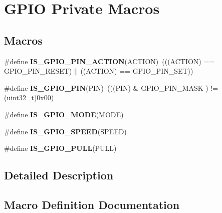 \hypertarget{group___g_p_i_o___private___macros}{}\section{G\+P\+IO Private Macros}
\label{group___g_p_i_o___private___macros}
\subsection*{Macros}
\begin{DoxyCompactItemize}
\item 
\#define {\bfseries I\+S\+\_\+\+G\+P\+I\+O\+\_\+\+P\+I\+N\+\_\+\+A\+C\+T\+I\+ON}(A\+C\+T\+I\+ON)~(((A\+C\+T\+I\+ON) == G\+P\+I\+O\+\_\+\+P\+I\+N\+\_\+\+R\+E\+S\+ET) $\vert$$\vert$ ((A\+C\+T\+I\+ON) == G\+P\+I\+O\+\_\+\+P\+I\+N\+\_\+\+S\+ET))\hypertarget{group___g_p_i_o___private___macros_ga6da646a4924c5cfae3024c660476f26f}{}\label{group___g_p_i_o___private___macros_ga6da646a4924c5cfae3024c660476f26f}

\item 
\#define {\bfseries I\+S\+\_\+\+G\+P\+I\+O\+\_\+\+P\+IN}(P\+IN)~(((P\+IN) \& G\+P\+I\+O\+\_\+\+P\+I\+N\+\_\+\+M\+A\+SK ) != (uint32\+\_\+t)0x00)\hypertarget{group___g_p_i_o___private___macros_gad6ec74e33360395535ad5d91ba6d4781}{}\label{group___g_p_i_o___private___macros_gad6ec74e33360395535ad5d91ba6d4781}

\item 
\#define {\bfseries I\+S\+\_\+\+G\+P\+I\+O\+\_\+\+M\+O\+DE}(M\+O\+DE)
\item 
\#define {\bfseries I\+S\+\_\+\+G\+P\+I\+O\+\_\+\+S\+P\+E\+ED}(S\+P\+E\+ED)
\item 
\#define {\bfseries I\+S\+\_\+\+G\+P\+I\+O\+\_\+\+P\+U\+LL}(P\+U\+LL)
\end{DoxyCompactItemize}


\subsection{Detailed Description}


\subsection{Macro Definition Documentation}
